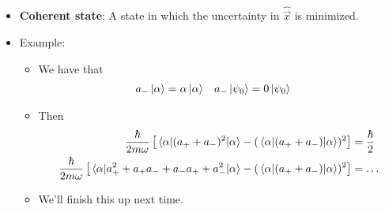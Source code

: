 \documentclass[../notes.tex]{subfiles}
\begin{document}
\begin{itemize}
\begin{itemize}
    \end{itemize}
    \item \textbf{Coherent state}: A state in which the uncertainty in $\hat{\vec{x}}$ is minimized.
    \item Example:
    \begin{itemize}
        \item We have that
        \begin{align*}
            a_-\ket{\alpha} &= \alpha\ket{\alpha}&
            a_-\ket{\psi_0} &= 0\ket{\psi_0}
        \end{align*}
        \item Then
        \begin{align*}
            \frac{\hbar}{2m\omega}\left[ \ev{(a_++a_-)^2}{\alpha}-(\ev{(a_++a_-)}{\alpha})^2 \right] &= \frac{\hbar}{2}\\
            \frac{\hbar}{2m\omega}\left[ \ev{a_+^2+a_+a_-+a_-a_++a_-^2}{\alpha}-(\ev{(a_++a_-)}{\alpha})^2 \right] &= \dots
        \end{align*}
        \item We'll finish this up next time.
    \end{itemize}
\end{itemize}
\end{document}
